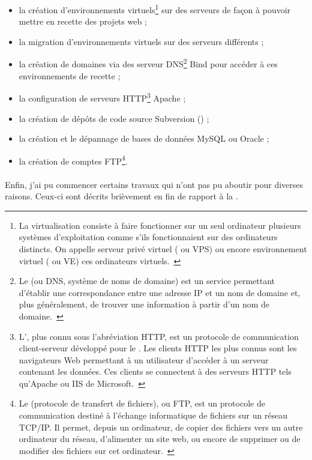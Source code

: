 \begin{itemize}
	\item la création d'environnements virtuels\footnote{La virtualisation consiste à faire fonctionner sur un seul ordinateur plusieurs systèmes d'exploitation comme s'ils fonctionnaient sur des ordinateurs distincts. On appelle serveur privé virtuel ( ou VPS) ou encore environnement virtuel ( ou VE) ces ordinateurs virtuels.~\cite{virtualisation}} sur des serveurs de façon à pouvoir mettre en recette des projets web ;
	\item la migration d'environnements virtuels sur des serveurs différents ;
	\item la création de domaines via des serveur DNS\footnote{Le  (ou DNS, système de noms de domaine) est un service permettant d'établir une correspondance entre une adresse IP et un nom de domaine et, plus généralement, de trouver une information à partir d'un nom de domaine.~\cite{dns}} Bind pour accéder à ces environnements de recette ;
	\item la configuration de serveurs HTTP\footnote{L', plus connu sous l'abréviation HTTP, est un protocole de communication client-serveur développé pour le . Les clients HTTP les plus connus sont les navigateurs Web permettant à un utilisateur d'accéder à un serveur contenant les données. Ces clients se connectent à des serveurs HTTP tels qu'Apache ou IIS de Microsoft.~\cite{http}} Apache ;
	\item la création de dépôts de code source Subversion () ;
	\item la création et le dépannage de bases de données MySQL ou Oracle ;
	\item la création de comptes FTP\footnote{Le  (protocole de transfert de fichiers), ou FTP, est un protocole de communication destiné à l'échange informatique de fichiers sur un réseau TCP/IP. Il permet, depuis un ordinateur, de copier des fichiers vers un autre ordinateur du réseau, d'alimenter un site web, ou encore de supprimer ou de modifier des fichiers sur cet ordinateur.~\cite{ftp}}.
\end{itemize}

\paragraph{}
Enfin, j'ai pu commencer certains travaux qui n'ont pas pu aboutir pour diverses raisons.
Ceux-ci sont décrits brièvement en fin de rapport à la .



